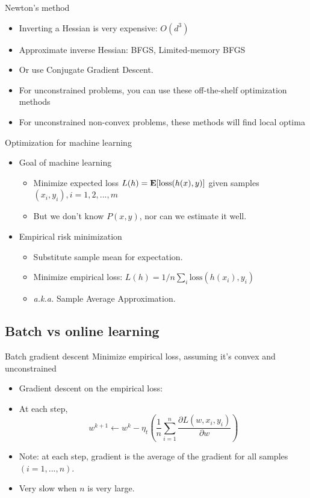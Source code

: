 \documentclass[notes]{beamer}
\begin{document}
\begin{frame}
	{Newton's method}
	\begin{itemize}
		\item Inverting a Hessian is very expensive: $O(d^3)$
		\item Approximate inverse Hessian: BFGS, Limited-memory BFGS
		\item Or use Conjugate Gradient Descent.
		\item For unconstrained problems, you can use these off-the-shelf optimization methods
		\item For unconstrained non-convex problems, these methods  will find local optima
	\end{itemize}
\end{frame}

\begin{frame}
	{Optimization for machine learning}
	\begin{itemize}
		\item Goal of machine learning
		      \begin{itemize}
			      \item Minimize expected loss $L(h) = \mathbf{E} [ \mathrm{loss} (h(x),y )] $ given samples $(x_i,y_i ), i = 1,2,...,m $
			      \item But we don't know $P(x,y)$, nor can we estimate it well.

		      \end{itemize}
		\item Empirical risk minimization
		      \begin{itemize}
			      \item Substitute sample mean for expectation.
			      \item Minimize empirical loss: $L(h) = 1/n \sum_i \mathrm{loss} (h(x_i), y_i ) $
			      \item \textit{a.k.a. } Sample Average Approximation.
		      \end{itemize}
	\end{itemize}
\end{frame}

\subsection{Batch vs online learning}

\begin{frame}{Batch gradient descent}
	Minimize empirical loss, assuming it's convex and unconstrained
	\begin{itemize}
		\item Gradient descent on the empirical loss:
		\item At each step,
		      $$w^{k+1} \leftarrow w^{k} - \eta_t
			      \left( \frac{1}{n} \sum_{i=1}^{n}
			      \frac{\partial L(w,x_i,y_i)}{\partial w} \right) $$
		\item Note: at each step, gradient is the average of the gradient for all samples $(i=1,...,n)$.
		\item Very slow when $n$  is very large.
	\end{itemize}

\end{frame}
\end{document}
